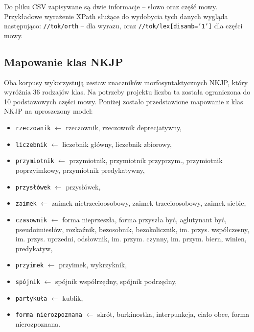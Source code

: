 Do pliku CSV zapisywane są dwie informacje -- słowo oraz część mowy.
Przykładowe wyrażenie XPath służące do wydobycia tych danych wygląda następująco:
\texttt{//tok/orth} -- dla wyrazu, oraz \texttt{//tok/lex[disamb='1']} dla części mowy.

	\subsection{Mapowanie klas NKJP}
Oba korpusy wykorzystują zestaw znaczników morfosyntaktycznych NKJP, który wyróżnia 36 rodzajów klas.
Na potrzeby projektu liczba ta została ograniczona do 10 podstawowych części mowy. Poniżej zostało przedstawione mapowanie z klas NKJP na uproszczony model:
\begin{itemize}
\item \texttt{rzeczownik} $\leftarrow$ rzeczownik, rzeczownik deprecjatywny,
\item \texttt{liczebnik} $\leftarrow$ liczebnik główny, liczebnik zbiorowy,
\item \texttt{przymiotnik} $\leftarrow$ przymiotnik, przymiotnik przyprzym., przymiotnik poprzyimkowy, przymiotnik predykatywny,
\item \texttt{przysłówek} $\leftarrow$ przysłówek,
\item \texttt{zaimek} $\leftarrow$ zaimek nietrzecioosobowy, zaimek trzecioosobowy, zaimek siebie,
\item \texttt{czasownik} $\leftarrow$ forma nieprzeszła, forma przyszła być, aglutynant być, pseudoimiesłów, rozkaźnik, bezosobnik, bezokolicznik, im. przys. współczesny, im. przys. uprzedni, odsłownik, im. przym. czynny, im. przym. biern, winien, predykatyw,
\item \texttt{przyimek} $\leftarrow$ przyimek, wykrzyknik,
\item \texttt{spójnik} $\leftarrow$ spójnik współrzędny, spójnik podrzędny,
\item \texttt{partykuła} $\leftarrow$ kublik,
\item \texttt{forma nierozpoznana} $\leftarrow$ skrót, burkinostka, interpunkcja, ciało obce, forma nierozpoznana.
\end{itemize}